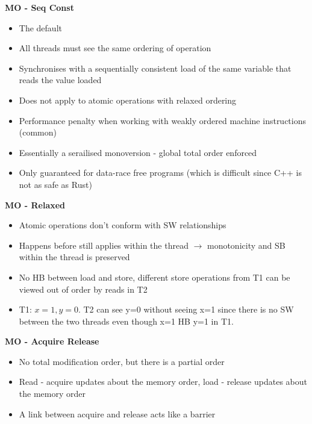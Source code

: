 \documentclass[10pt, landscape]{article}
\begin{document}
\begin{multicols}{4}
\textbf{MO - Seq Const} \\
\begin{itemize}
    \item The default
    \item All threads must see the same ordering of operation
    \item Synchronises with a sequentially consistent load of the same variable that reads the value loaded 
    \item Does not apply to atomic operations with relaxed ordering
    \item Performance penalty when working with weakly ordered machine instructions (common) 
    \item Essentially a serailised monoversion - global total order enforced    
    \item Only guaranteed for data-race free programs (which is difficult since C++ is not as safe as Rust)
\end{itemize}

\textbf{MO - Relaxed} \\ 
\begin{itemize}
    \item Atomic operations don't conform with SW relationships
    \item Happens before still applies within the thread $\rightarrow$ monotonicity and SB within the thread is preserved
    \item No HB between load and store, different store operations from T1 can be viewed out of order by reads in T2
    \item T1: $x=1, y=0$. T2 can see y=0 without seeing x=1 since there is no SW between the two threads even though x=1 HB y=1 in T1.  
\end{itemize}


\textbf{MO - Acquire Release} \\
\begin{itemize}
    \item No total modification order, but there is a partial order
    \item Read - acquire updates about the memory order, load - release updates about the memory order
    \item A link between acquire and release acts like a barrier 
\end{itemize}



\end{multicols}
\end{document}
